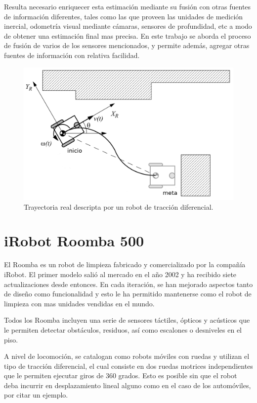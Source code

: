 Resulta necesario enriquecer esta estimación mediante su fusión con otras fuentes de información diferentes, tales como las que proveen las unidades de medición inercial, odometría visual mediante cámaras, sensores de profundidad, etc a modo de obtener una estimación final mas precisa. En este trabajo se aborda el proceso de fusión de varios de los sensores mencionados, y permite además, agregar otras fuentes de información con relativa facilidad.

\begin{figure}[ht]
    \centering
    \includegraphics[scale=0.8]{./Figures/navigation.png}
    \caption{Trayectoria real descripta por un robot de tracción diferencial.}
    \label{fig:navigation}
\end{figure}

\section{iRobot Roomba 500}\label{sec:roomba}

El Roomba es un robot de limpieza fabricado y comercializado por la compañía iRobot. El primer modelo salió al mercado en el año 2002 y ha recibido siete actualizaciones desde entonces. En cada iteración, se han mejorado aspectos tanto de diseño como funcionalidad y esto le ha permitido mantenerse como el robot de limpieza con mas unidades vendidas en el mundo.

Todos los Roomba incluyen una serie de sensores táctiles, ópticos y acústicos que le permiten detectar obstáculos, residuos, así como escalones o desniveles en el piso.

A nivel de locomoción, se catalogan como robots móviles con ruedas y utilizan el tipo de tracción diferencial, el cual consiste en dos ruedas motrices independientes que le permiten ejecutar giros de 360 grados. Esto es posible sin que el robot deba incurrir en desplazamiento lineal alguno como en el caso de los automóviles, por citar un ejemplo.

